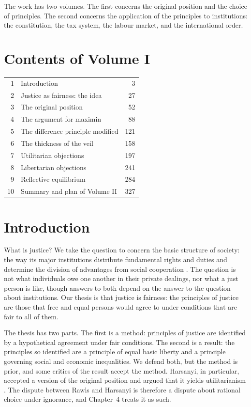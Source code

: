 \documentclass{situationist-preprint}
\begin{document}
The work has two volumes. The first concerns the original position and the choice of principles. The second concerns the application of the principles to institutions: the constitution, the tax system, the labour market, and the international order.

\section*{Contents of Volume I}

\begin{center}\small
\begin{tabular}{@{}rlr@{}}
1 & Introduction & 3 \\
2 & Justice as fairness: the idea & 27 \\
3 & The original position & 52 \\
4 & The argument for maximin & 88 \\
5 & The difference principle modified & 121 \\
6 & The thickness of the veil & 158 \\
7 & Utilitarian objections & 197 \\
8 & Libertarian objections & 241 \\
9 & Reflective equilibrium & 284 \\
10 & Summary and plan of Volume II & 327 \\
\end{tabular}
\end{center}

\section{Introduction}

What is justice? We take the question to concern the basic structure of society: the way its major institutions distribute fundamental rights and duties and determine the division of advantages from social cooperation \citep{Rawls1971}. The question is not what individuals owe one another in their private dealings, nor what a just person is like, though answers to both depend on the answer to the question about institutions. Our thesis is that justice is fairness: the principles of justice are those that free and equal persons would agree to under conditions that are fair to all of them.

The thesis has two parts. The first is a method: principles of justice are identified by a hypothetical agreement under fair conditions. The second is a result: the principles so identified are a principle of equal basic liberty and a principle governing social and economic inequalities. We defend both, but the method is prior, and some critics of the result accept the method. Harsanyi, in particular, accepted a version of the original position and argued that it yields utilitarianism \citep{Harsanyi1975}. The dispute between Rawls and Harsanyi is therefore a dispute about rational choice under ignorance, and Chapter~4 treats it as such.
\end{document}
